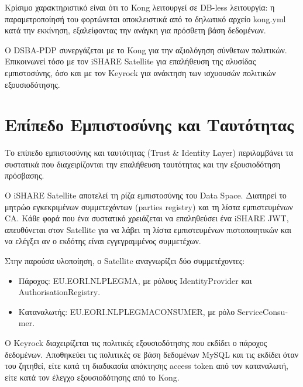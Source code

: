 Κρίσιμο χαρακτηριστικό είναι ότι το \textlatin{Kong} λειτουργεί σε
\textlatin{DB-less} λειτουργία: η παραμετροποίησή του φορτώνεται αποκλειστικά
από το δηλωτικό αρχείο \textlatin{kong.yml} κατά την εκκίνηση, εξαλείφοντας
την ανάγκη για πρόσθετη βάση δεδομένων.

Ο \textlatin{DSBA-PDP} συνεργάζεται με το \textlatin{Kong} για την αξιολόγηση
σύνθετων πολιτικών. Επικοινωνεί τόσο με τον \textlatin{iSHARE Satellite} για
επαλήθευση της αλυσίδας εμπιστοσύνης, όσο και με τον \textlatin{Keyrock} για
ανάκτηση των ισχυουσών πολιτικών εξουσιοδότησης.

\section{Επίπεδο Εμπιστοσύνης και Ταυτότητας}
\label{sec:trust-identity-layer}

Το επίπεδο εμπιστοσύνης και ταυτότητας (\textlatin{Trust \& Identity Layer})
περιλαμβάνει τα συστατικά που διαχειρίζονται την επαλήθευση ταυτότητας και
την εξουσιοδότηση πρόσβασης.

Ο \textlatin{iSHARE Satellite} αποτελεί τη ρίζα εμπιστοσύνης του
\textlatin{Data Space}. Διατηρεί το μητρώο εγκεκριμένων συμμετεχόντων
(\textlatin{parties registry}) και τη λίστα εμπιστευμένων \textlatin{CA}.
Κάθε φορά που ένα συστατικό χρειάζεται να επαληθεύσει ένα \textlatin{iSHARE JWT},
απευθύνεται στον \textlatin{Satellite} για να λάβει τη λίστα εμπιστευμένων
πιστοποιητικών και να ελέγξει αν ο εκδότης είναι εγγεγραμμένος συμμετέχων.

Στην παρούσα υλοποίηση, ο \textlatin{Satellite} αναγνωρίζει δύο συμμετέχοντες:
\begin{itemize}
    \item Πάροχος: \textlatin{EU.EORI.NLPLEGMA}, με ρόλους
    \textlatin{IdentityProvider} και \textlatin{AuthorisationRegistry}.
    \item Καταναλωτής: \textlatin{EU.EORI.NLPLEGMACONSUMER}, με ρόλο
    \textlatin{ServiceConsumer}.
\end{itemize}

Ο \textlatin{Keyrock} διαχειρίζεται τις πολιτικές εξουσιοδότησης που εκδίδει
ο πάροχος δεδομένων. Αποθηκεύει τις πολιτικές σε βάση δεδομένων
\textlatin{MySQL} και τις εκδίδει όταν του ζητηθεί, είτε κατά τη διαδικασία
απόκτησης \textlatin{access token} από τον καταναλωτή, είτε κατά τον έλεγχο
εξουσιοδότησης από το \textlatin{Kong}.

